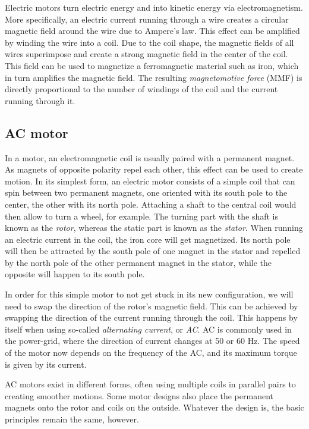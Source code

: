Electric motors turn electric energy and into kinetic energy via electromagnetism. More specifically, an electric current running through a wire creates a circular magnetic field around the wire due to Ampere's law. This effect can be amplified by winding the wire into a coil. Due to the coil shape, the magnetic fields of all wires superimpose and create a strong magnetic field in the center of the coil. This field can be used to magnetize a ferromagnetic material such as iron, which in turn amplifies the magnetic field. The resulting \textsl{magnetomotive force} (MMF) is directly proportional to the number of windings of the coil and the current running through it.

\subsection{AC motor}
In a motor, an electromagnetic coil is usually paired with a permanent magnet. As magnets of opposite polarity repel each other, this effect can be used to create motion. In its simplest form, an electric motor consists of a simple coil that can spin between two permanent magnets, one oriented with its south pole to the center, the other with its north pole. Attaching a shaft to the central coil would then allow to turn a wheel, for example. The turning part with the shaft is known as the \textsl{rotor}, whereas the static part is known as the \textsl{stator}. When running an electric current in the coil, the iron core will get magnetized. Its north pole will then be attracted by the south pole of one magnet in the stator and repelled by the north pole of the other permanent magnet in the stator, while the opposite will happen to its south pole.

In order for this simple motor to not get stuck in its new configuration, we will need to swap the direction of the rotor's magnetic field. This can be achieved by swapping the direction of the current running through the coil. This happens by itself when using so-called \textsl{alternating current}, or \textsl{AC}. AC is commonly used in the power-grid, where the direction of current changes at 50 or 60 Hz. The speed of the motor now depends on the frequency of the AC, and its maximum torque is given by its current.

AC motors exist in different forms, often using multiple coils in parallel pairs to creating smoother motions. Some motor designs also place the permanent magnets onto the rotor and coils on the outside. Whatever the design is, the basic principles remain the same, however.

